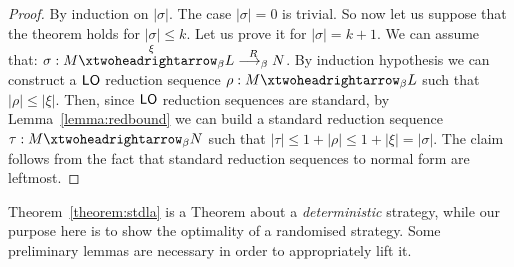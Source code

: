 \begin{proof}
	By induction on $|\sigma|$. The case $|\sigma|=0$ is trivial. So now
	let us suppose that the theorem holds for $|\sigma|\leq k$. Let us
	prove it for $|\sigma|= k+1$. We can assume that:
	$\sigma:\termone \redbetared{\xi} \termthree \redbetardx{\rdxone} \termtwo$.
	By induction hypothesis we can construct a $\textsf{LO}$ reduction
	sequence $\rho:\termone \redbetared{} \termthree$ such that
	$|\rho|\leq |\xi|$. Then, since $\textsf{LO}$ reduction sequences are standard, by Lemma~\ref{lemma:redbound} we
	can build a standard reduction sequence
	$\tau:\termone\redbetared{} \termtwo$ such that $|\tau|\leq
	1+|\rho|\leq 1+|\xi|=|\sigma|$. The claim follows from the fact
	that standard reduction sequences to normal form are leftmost.
\end{proof}
Theorem~\ref{theorem:stdla} is a Theorem about a \emph{deterministic}
strategy, while our purpose here is to show the optimality of a
randomised strategy. Some preliminary lemmas are necessary in
order to appropriately lift it.

